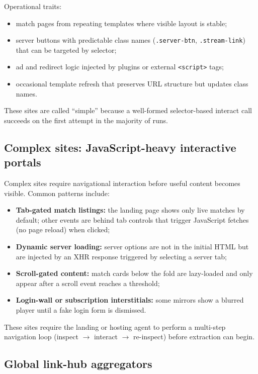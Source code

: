 Operational traits:
\begin{itemize}
  \item match pages from repeating templates where visible layout is stable;
  \item server buttons with predictable class names (\texttt{.server-btn},
    \texttt{.stream-link}) that can be targeted by selector;
  \item ad and redirect logic injected by plugins or external \texttt{<script>} tags;
  \item occasional template refresh that preserves URL structure but updates class names.
\end{itemize}

These sites are called ``simple'' because a well-formed selector-based interact call
succeeds on the first attempt in the majority of runs.

\subsection{Complex sites: JavaScript-heavy interactive portals}

Complex sites require navigational interaction before useful content becomes visible.
Common patterns include:

\begin{itemize}
  \item \textbf{Tab-gated match listings:} the landing page shows only live matches by
    default; other events are behind tab controls that trigger JavaScript fetches
    (no page reload) when clicked;
  \item \textbf{Dynamic server loading:} server options are not in the initial HTML but
    are injected by an XHR response triggered by selecting a server tab;
  \item \textbf{Scroll-gated content:} match cards below the fold are lazy-loaded and
    only appear after a scroll event reaches a threshold;
  \item \textbf{Login-wall or subscription interstitials:} some mirrors show a blurred
    player until a fake login form is dismissed.
\end{itemize}

These sites require the landing or hosting agent to perform a multi-step navigation
loop (inspect $\to$ interact $\to$ re-inspect) before extraction can begin.

\subsection{Global link-hub aggregators}

